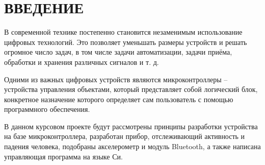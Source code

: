 \begin{sloppypar} %
\newpage %
\section*{ВВЕДЕНИЕ} %

В современной технике постепенно становится незаменимым использование цифровых технологий. Это позволяет уменьшать размеры устройств и решать огромное число задач, в том числе задачи автоматизации, задачи приёма, обработки и хранения различных сигналов и т. д.


Одними из важных цифровых устройств являются микроконтроллеры –  устройства управления объектами, который представляет собой логический блок, конкретное назначение которого определяет сам пользователь с помощью программного обеспечения.


В данном курсовом проекте будут рассмотрены принципы разработки устройства на базе микроконтроллера, разработан прибор, отслеживающий активность и падения человека, подобраны акселерометр и модуль Bluetooth, а также написана управляющая программа на языке Си. 


\end{sloppypar}
